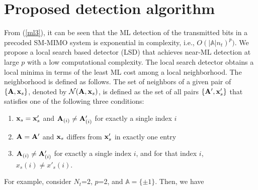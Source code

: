 \documentclass[11pt, onecolumn]{report}
\newcommand{\vx}{{\bf x}}
\newcommand{\ma}{{\bf A}}
\newcommand{\sa}{{\mathbb A}}
\begin{document}
\section{Proposed detection algorithm}

From (\ref{ml3}), it can be seen that the ML detection of the transmitted 
bits in a precoded SM-MIMO system is exponential in complexity, i.e.,
$O(|\sa|n_t)^p)$. We propose a local search based detector (LSD)
that achieves near-ML detection at large $p$ with a low computational 
complexity. The local search detector obtains a local minima in terms of
the least ML cost among a local neighborhood. The neighborhood is defined as follows. The set of neighbors of a given
pair of $\{\ma, \vx_s\}$, denoted by ${\mathcal N}(\ma, \vx_s)$, is defined as the 
set of all pairs $\{\ma', \vx_s'\}$ that satisfies one of the following 
three conditions:
\begin{enumerate}
\item
$\vx_s=\vx_s'$ and $\ma_{(i)}\neq\ma_{(i)}'$ for exactly a single index
$i$
\item 
$\ma=\ma'$ and $\vx_s$ differs from $\vx_s'$ in exactly one entry
\item
$\ma_{(i)}\neq\ma_{(i)}'$ for exactly a single index $i$, and for that 
index $i$, $x_s(i)\neq x'_s(i)$.
\end{enumerate}

For example, consider $N_t$=2, $p$=2, and  $\sa=\{\pm1\}$.  Then, we have
 
\end{document}
